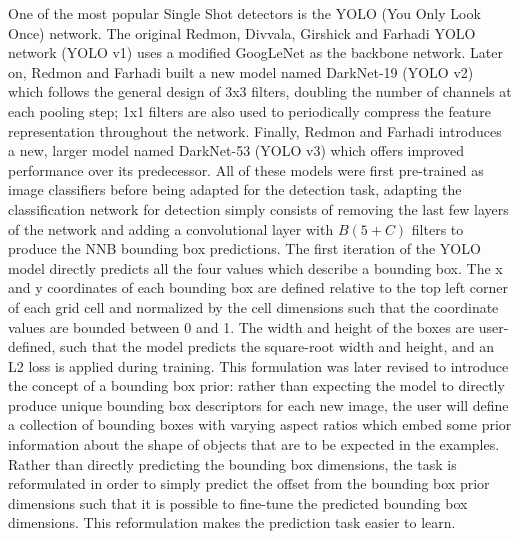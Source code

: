 One of the most popular Single Shot detectors is the YOLO (You Only Look Once) network. The original Redmon, Divvala, Girshick and Farhadi YOLO network (YOLO v1) uses a modified GoogLeNet as the backbone network. Later on, Redmon and Farhadi built a new model named DarkNet-19 (YOLO v2) which follows the general design of 3x3 filters, doubling the number of channels at each pooling step; 1x1 filters are also used to periodically compress the feature representation throughout the network. Finally, Redmon and Farhadi introduces a new, larger model named DarkNet-53 (YOLO v3) which offers improved performance over its predecessor. All of these models were first pre-trained as image classifiers before being adapted for the detection task, adapting the classification network for detection simply consists of removing the last few layers of the network and adding a convolutional layer with $B(5+C)$ filters to produce the NNB bounding box predictions.
The first iteration of the YOLO model directly predicts all the four values which describe a bounding box. The x and y coordinates of each bounding box are defined relative to the top left corner of each grid cell and normalized by the cell dimensions such that the coordinate values are bounded between 0 and 1. The width and height of the boxes are user-defined, such that the model predicts the square-root width and height, and an L2 loss is applied during training. This formulation was later revised to introduce the concept of a bounding box prior: rather than expecting the model to directly produce unique bounding box descriptors for each new image, the user will define a collection of bounding boxes with varying aspect ratios which embed some prior information about the shape of objects that are to be expected in the examples. Rather than directly predicting the bounding box dimensions, the task is reformulated in order to simply predict the offset from the bounding box prior dimensions such that it is possible to fine-tune the predicted bounding box dimensions. This reformulation makes the prediction task easier to learn.